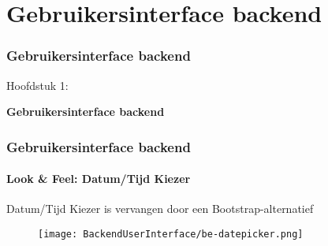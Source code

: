 %

\section{Gebruikersinterface backend}
\begin{frame}[fragile]
	\frametitle{Gebruikersinterface backend}

	\begin{center}\huge{Hoofdstuk 1:}\end{center}
	\begin{center}\huge{\color{typo3darkgrey}\textbf{Gebruikersinterface backend}}\end{center}

\end{frame}


\begin{frame}[fragile]
	\frametitle{Gebruikersinterface backend}
	\framesubtitle{Look \& Feel: Datum/Tijd Kiezer}

	Datum/Tijd Kiezer is vervangen door een Bootstrap-alternatief
	\begin{figure}
		\texttt{[image: BackendUserInterface/be-datepicker.png]}
	\end{figure}

\end{frame}


